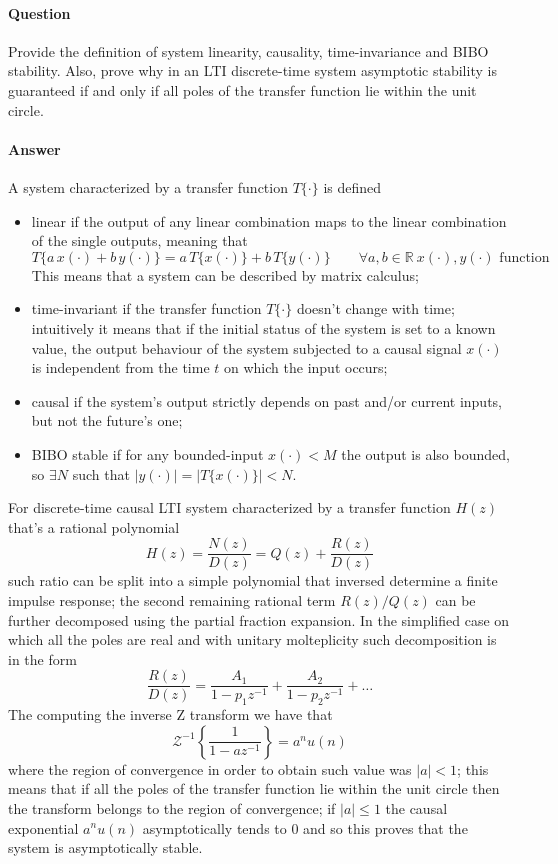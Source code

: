 \newquestion
	\paragraph{Question} Provide the definition of system linearity, causality, time-invariance and BIBO stability. Also, prove why	in an LTI discrete-time system asymptotic stability is guaranteed if and only if all poles of the transfer function lie within the unit circle.
	
	\paragraph{Answer} A system characterized by a transfer function $T\{\cdot\}$ is defined
	\begin{itemize}
		\item linear if the output of any linear combination maps to the linear combination of the single outputs, meaning that
		\[ T \{ a\, x(\cdot) +b\, y(\cdot)\} = a\, T\{x(\cdot)\} + b \, T\{ y(\cdot)\} \qquad \forall a,b\in \mathds R \ x(\cdot),y(\cdot) \textrm{ function} \]
		This means that a system can be described by matrix calculus;
		
		\item time-invariant if the transfer function $T\{\cdot\}$ doesn't change with time;  intuitively it means that if the initial status of the system is set to a known value, the output behaviour of the system subjected to a causal signal $x(\cdot)$ is independent from the time $t$ on which the input occurs;
		
		\item causal if the system's output strictly depends on past and/or current inputs, but not the future's one;
		
		\item BIBO stable if for any bounded-input $x(\cdot) < M$ the output is also bounded, so $\exists N$ such that $ |y(\cdot)| = |T\{x(\cdot)\}| < N$.		
	\end{itemize}

	For discrete-time causal LTI system characterized by a transfer function $H(z)$ that's a rational polynomial
	\[ H(z) = \frac{N(z)}{D(z)} = Q(z) + \frac{R(z)}{D(z)} \]
	such ratio can be split into a simple polynomial that inversed determine a finite impulse response; the second remaining rational term $R(z)/Q(z)$ can be further decomposed using the partial fraction expansion. In the simplified case on which all the poles are real and with unitary molteplicity such decomposition is in the form
	\[ \frac{R(z)}{D(z)} = \frac{A_1}{1-p_1 z^{-1}} +  \frac{A_2}{1-p_2 z^{-1}} + \dots \]
	The computing the inverse Z transform we have that
	\[ \mathcal Z ^{-1} \left\{ \frac 1 {1-az^{-1}} \right\} = a^nu(n) \]
	where the region of convergence in order to obtain such value was $|a| < 1$; this means that if all the poles of the transfer function lie within the unit circle then the transform belongs to the region of convergence; if $|a|\leq 1$ the causal exponential $a^nu(n)$ asymptotically tends to $0$ and so this proves that the system is asymptotically stable.
	
